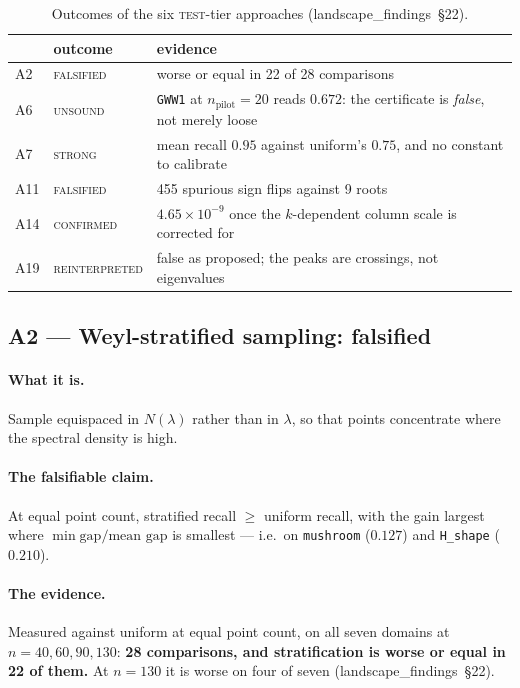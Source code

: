 \documentclass[11pt]{article}
\newcommand{\file}[1]{\texttt{#1}}
\newcommand{\lf}[1]{(landscape\_findings~\S#1)}
\newcommand{\lam}{\lambda}
\begin{document}
\begin{table}[htbp]
\centering
\caption{Outcomes of the six \textsc{test}-tier approaches \lf{22}.}
\label{tab:six}
\begin{tabular}{llp{7.2cm}}
\toprule
& outcome & evidence \\
\midrule
A2  & \textsc{falsified}      & worse or equal in 22 of 28 comparisons \\
A6  & \textsc{unsound}        & \file{GWW1} at $n_{\mathrm{pilot}}=20$ reads $0.672$: the
                                certificate is \emph{false}, not merely loose \\
A7  & \textsc{strong}         & mean recall $0.95$ against uniform's $0.75$, and no constant to
                                calibrate \\
A11 & \textsc{falsified}      & 455 spurious sign flips against 9 roots \\
A14 & \textsc{confirmed}      & $4.65\times10^{-9}$ once the $k$-dependent column scale is
                                corrected for \\
A19 & \textsc{reinterpreted}  & false as proposed; the peaks are crossings, not eigenvalues \\
\bottomrule
\end{tabular}
\end{table}

\subsection{A2 --- Weyl-stratified sampling: falsified}

\paragraph{What it is.} Sample equispaced in $N(\lam)$ rather than in $\lam$, so that points
concentrate where the spectral density is high.

\paragraph{The falsifiable claim.} At equal point count, stratified recall $\ge$ uniform recall,
with the gain largest where $\min\text{gap}/\text{mean gap}$ is smallest --- i.e.\ on
\file{mushroom} ($0.127$) and \file{H\_shape} ($0.210$).

\paragraph{The evidence.} Measured against uniform at equal point count, on all seven domains at
$n = 40, 60, 90, 130$: \textbf{28 comparisons, and stratification is worse or equal in 22 of
them.} At $n = 130$ it is worse on four of seven \lf{22}.
\end{document}
